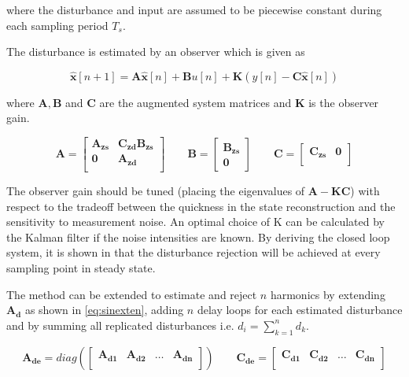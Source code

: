 where the disturbance and input are assumed to be piecewise constant during each sampling period $T_s$.

The disturbance is estimated by an observer which is given as

\begin{equation}
  \label{eq:obs}
  \mathbf{\hat{x}}[n + 1] = \mathbf{A\hat{x}}[n] + \mathbf{B}u[n] + \mathbf{K}(y[n] - \mathbf{C\hat{x}}[n])
\end{equation}

where $\mathbf{A, B}$ and $\mathbf{C}$ are the augmented system matrices and $\mathbf{K}$ is the observer gain.

\begin{equation}
  \label{eq:augumented}
  \mathbf{A} =
    \begin{bmatrix}
       \mathbf{A_{zs}} & \mathbf{C_{zd}B_{zs}}\\[0.3em]
       \mathbf{0} & \mathbf{A_{zd}}\\
     \end{bmatrix}
     \qquad
  \mathbf{B} =
    \begin{bmatrix}
        \mathbf{B_{zs}}\\
        \mathbf{0}
    \end{bmatrix}
     \qquad
  \mathbf{C} =
    \begin{bmatrix}
        \mathbf{C_{zs}} & \mathbf{0}\\
    \end{bmatrix}
\end{equation}

The observer gain should be tuned (placing the eigenvalues of $\mathbf{A-KC}$) with respect to the tradeoff between the quickness in the state reconstruction and the sensitivity to measurement noise. An optimal choice of K can be calculated by the Kalman filter if the noise intensities are known. By deriving the closed loop system, it is shown in \citep{fujimoto2004repetitive} that the disturbance rejection will be achieved at every sampling point in steady state.

The method can be extended to estimate and reject $n$ harmonics by extending $\mathbf{A_d}$ as shown in \eqref{eq:sinexten}, adding $n$ delay loops for each estimated disturbance and by  summing all replicated disturbances i.e. $d_i = \sum_{k=1}^{n} d_k$.

\begin{equation}
  \label{eq:sinexten}
  \mathbf{A_{de}} =
    diag(\begin{bmatrix}
      \mathbf{A_{d1}}  &  \mathbf{A_{d2}} & \hdots & \mathbf{A_{dn}} \\
     \end{bmatrix})
     \qquad
  \mathbf{C_{de}} =
    \begin{bmatrix}
       \mathbf{C_{d1}}  &  \mathbf{C_{d2}} & \hdots & \mathbf{C_{dn}} \\
    \end{bmatrix}
\end{equation}



